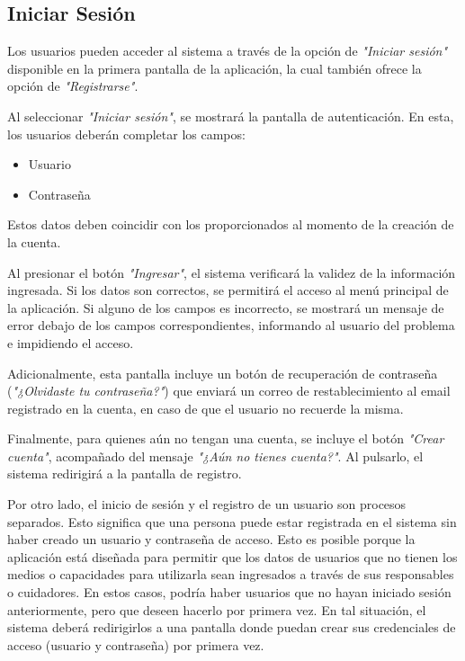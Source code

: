\documentclass[a4paper,12pt]{article}
\begin{document}
    \subsection{Iniciar Sesión}
    \par Los usuarios pueden acceder al sistema a través de la opción de \textit{"Iniciar sesión"} disponible en la primera pantalla de la aplicación, la cual también ofrece la opción de \textit{"Registrarse"}.
    \par Al seleccionar \textit{"Iniciar sesión"}, se mostrará la pantalla de autenticación. En esta, los usuarios deberán completar los campos:
    \begin{itemize}
        \item Usuario
        \item Contraseña
    \end{itemize}
    \par Estos datos deben coincidir con los proporcionados al momento de la creación de la cuenta. 
    \par Al presionar el botón \textit{"Ingresar"}, el sistema verificará la validez de la información ingresada. Si los datos son correctos, se permitirá el acceso al menú principal de la aplicación. Si alguno de los campos es incorrecto, se mostrará un mensaje de error debajo de los campos correspondientes, informando al usuario del problema e impidiendo el acceso.
    \par Adicionalmente, esta pantalla incluye un botón de recuperación de contraseña (\textit{"¿Olvidaste tu contraseña?"}) que enviará un correo de restablecimiento al email registrado en la cuenta, en caso de que el usuario no recuerde la misma.
    \par Finalmente, para quienes aún no tengan una cuenta, se incluye el botón \textit{"Crear cuenta"}, acompañado del mensaje \textit{"¿Aún no tienes cuenta?"}. Al pulsarlo, el sistema redirigirá a la pantalla de registro.
    \par Por otro lado, el inicio de sesión y el registro de un usuario son procesos separados. Esto significa que una persona puede estar registrada en el sistema sin haber creado un usuario y contraseña de acceso. Esto es posible porque la aplicación está diseñada para permitir que los datos de usuarios que no tienen los medios o capacidades para utilizarla sean ingresados a través de sus responsables o cuidadores. En estos casos, podría haber usuarios que no hayan iniciado sesión anteriormente, pero que deseen hacerlo por primera vez. En tal situación, el sistema deberá redirigirlos a una pantalla donde puedan crear sus credenciales de acceso (usuario y contraseña) por primera vez.
\end{document}
